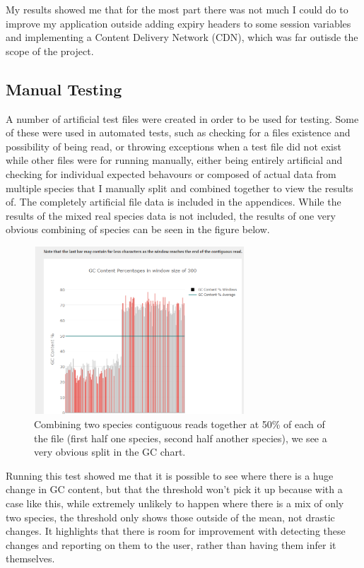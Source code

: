 My results showed me that for the most part there was not much I could do to improve my application outside adding expiry headers to some session variables and implementing a Content Delivery Network (CDN), which was far outisde the scope of the project.

\subsection{Manual Testing}
A number of artificial test files were created in order to be used for testing. Some of these were used in automated tests, such as checking for a files existence and possibility of being read, or throwing exceptions when a test file did not exist while other files were for running manually, either being entirely artificial and checking for individual expected behavours or composed of actual data from multiple species that I manually split and combined together to view the results of. The completely artificial file data is included in the appendices. While the results of the mixed real species data is not included, the results of one very obvious combining of species can be seen in the figure below.

\begin{figure}[H]
\centering
\includegraphics[width=0.7\textwidth]{images/combinedspecies}
\caption{Combining two species contiguous reads together at 50\% of each of the file (first half one species, second half another species), we see a very obvious split in the GC chart.}
\end{figure}

Running this test showed me that it is possible to see where there is a huge change in GC content, but that the threshold won't pick it up because with a case like this, while extremely unlikely to happen where there is a mix of only two species, the threshold only shows those outside of the mean, not drastic changes. It highlights that there is room for improvement with detecting these changes and reporting on them to the user, rather than having them infer it themselves.

